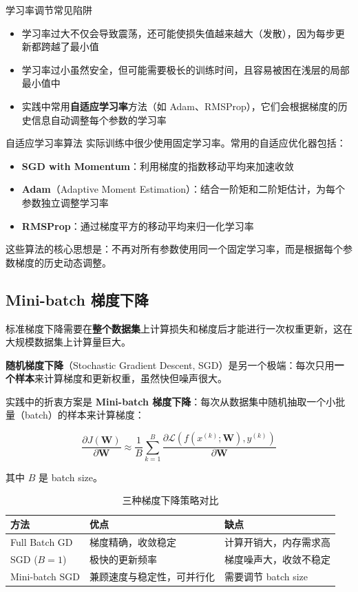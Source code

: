 \begin{warningbox}{学习率调节常见陷阱}
\begin{itemize}
\item 学习率过大不仅会导致震荡，还可能使损失值越来越大（发散），因为每步更新都跨越了最小值
\item 学习率过小虽然安全，但可能需要极长的训练时间，且容易被困在浅层的局部最小值中
\item 实践中常用\textbf{自适应学习率}方法（如 Adam、RMSProp），它们会根据梯度的历史信息自动调整每个参数的学习率
\end{itemize}
\end{warningbox}

\begin{importantbox}{自适应学习率算法}
实际训练中很少使用固定学习率。常用的自适应优化器包括：
\begin{itemize}
\item \textbf{SGD with Momentum}：利用梯度的指数移动平均来加速收敛
\item \textbf{Adam}（Adaptive Moment Estimation）：结合一阶矩和二阶矩估计，为每个参数独立调整学习率
\item \textbf{RMSProp}：通过梯度平方的移动平均来归一化学习率
\end{itemize}
这些算法的核心思想是：不再对所有参数使用同一个固定学习率，而是根据每个参数梯度的历史动态调整。
\end{importantbox}

\subsection{Mini-batch 梯度下降}

标准梯度下降需要在\textbf{整个数据集}上计算损失和梯度后才能进行一次权重更新，这在大规模数据集上计算量巨大。

\textbf{随机梯度下降}（Stochastic Gradient Descent, SGD）是另一个极端：每次只用\textbf{一个样本}来计算梯度和更新权重，虽然快但噪声很大。

实践中的折衷方案是 \textbf{Mini-batch 梯度下降}：每次从数据集中随机抽取一个小批量（batch）的样本来计算梯度：

$$\frac{\partial J(\mathbf{W})}{\partial \mathbf{W}} \approx \frac{1}{B}\sum_{k=1}^{B}\frac{\partial \mathcal{L}(f(x^{(k)}; \mathbf{W}), y^{(k)})}{\partial \mathbf{W}}$$

其中 $B$ 是 batch size。

\begin{table}[H]
\centering
\begin{tabular}{lp{4.5cm}p{4.5cm}}
\toprule
\textbf{方法} & \textbf{优点} & \textbf{缺点} \\
\midrule
Full Batch GD & 梯度精确，收敛稳定 & 计算开销大，内存需求高 \\
SGD ($B=1$) & 极快的更新频率 & 梯度噪声大，收敛不稳定 \\
Mini-batch SGD & 兼顾速度与稳定性，可并行化 & 需要调节 batch size \\
\bottomrule
\end{tabular}
\caption{三种梯度下降策略对比}
\end{table}

